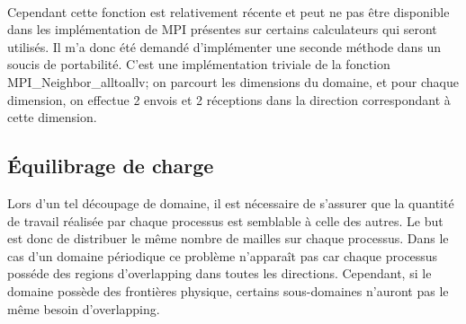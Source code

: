 \paragraph{}Cependant cette fonction est relativement récente et peut ne pas être disponible dans les implémentation de MPI présentes sur certains calculateurs qui seront utilisés. Il m'a donc été demandé d'implémenter une seconde méthode dans un soucis de portabilité. C'est une implémentation triviale de la fonction MPI\_Neighbor\_alltoallv; on parcourt les dimensions du domaine, et pour chaque dimension, on effectue 2 envois et 2 réceptions dans la direction correspondant à cette dimension.







\subsection{Équilibrage de charge}
Lors d'un tel découpage de domaine, il est nécessaire de s'assurer que la quantité de travail réalisée par chaque processus est semblable à celle des autres. Le but est donc de distribuer le même nombre de mailles sur chaque processus. Dans le cas d'un domaine périodique ce problème n'apparaît pas car chaque processus posséde des regions d'overlapping dans toutes les directions. Cependant, si le domaine possède des frontières physique, certains sous-domaines n'auront pas le même besoin d'overlapping.

